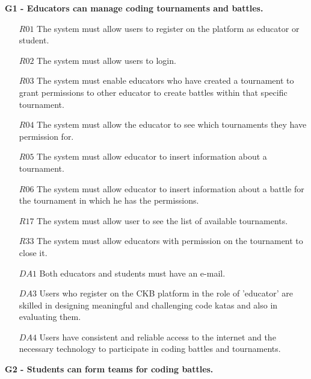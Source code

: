 \textbf{G1 - Educators can manage coding tournaments and battles.}
\begin{itemize}
    \item [$R01$] The system must allow users to register on the platform as educator or student.
    \item [$R02$]The system must allow users to login.
    \item [$R03$] The system must enable educators who have created a tournament to grant permissions to other
    educator to create battles within that specific tournament.
    \item [$R04$]The system must allow the educator to see which tournaments they have permission for.
    \item [$R05$] The system must allow educator to insert information about a tournament.
    \item [$R06$]The system must allow educator to insert information about a battle for the tournament in which
    he has the permissions.
    \item [$R17$]The system must allow user to see the list of available tournaments.
    \item [$R33$]The system must allow educators with permission on the tournament to close it.
\item [$DA1$]Both educators and students must have an e-mail.
\item [$DA3$] Users who register on the CKB platform in the role of 'educator' are skilled  in designing meaningful and challenging code katas and also in evaluating them.
\item [$DA4$] Users have consistent and reliable access to the internet and the necessary technology to participate in coding battles and tournaments.
   
\end{itemize}
  \textbf{G2 - Students can form teams for coding battles.}
